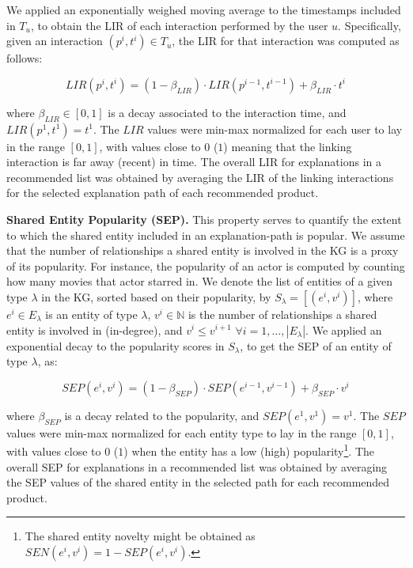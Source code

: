 \documentclass[sigconf]{acmart}
\begin{document}
We applied an exponentially weighed moving average to the timestamps included in $T_u$, to obtain the LIR of each interaction performed by the user $u$. 
Specifically, given an interaction $(p^i, t^i) \in T_u$, the LIR for that interaction was computed as follows: 

\vspace{-2mm}
\begin{equation} 
LIR(p^i, t^i) = ( 1 - \beta_{LIR} ) \cdot LIR(p^{i-1}, t^{i-1}) + \beta_{LIR} \cdot t^i    
\label{eq:lir}
\end{equation}

where $\beta_{LIR} \in [0, 1]$ is a decay associated to the interaction time, and $LIR(p^1, t^1) = t^1$. 
The $LIR$ values were min-max normalized for each user to lay in the range $[0, 1]$, with values close to $0$ ($1$) meaning that the linking interaction is far away (recent) in time. 
The overall LIR for explanations in a recommended list was obtained by averaging the LIR of the linking interactions for the selected explanation path of each recommended product.

\vspace{1mm}\noindent\textbf{Shared Entity Popularity (SEP).} 
This property serves to quantify the extent to which the shared entity included in an explanation-path is popular. 
We assume that the number of relationships a shared entity is involved in the KG is a proxy of its popularity. 
For instance, the popularity of an actor is computed by counting how many movies that actor starred in.
We denote the list of entities of a given type $\lambda$ in the KG, sorted based on their popularity, by $S_\lambda = [(e^i, v^i)]$, where $e^i \in E_\lambda$ is an entity of type $\lambda$, $v^i \in \mathbb N$ is the number of relationships a shared entity is involved in (in-degree), and $v^i \leq v^{i+1}$ $\forall i = 1, \dots, |E_\lambda|$. 
We applied an exponential decay to the popularity scores in $S_\lambda$, to get the SEP of an entity of type $\lambda$, as: 

\vspace{-2mm}
\begin{equation} 
SEP(e^i, v^i) = ( 1 - \beta_{SEP} ) \cdot SEP(e^{i-1}, v^{i-1}) + \beta_{SEP} \cdot v^i    
\label{eq:sep}
\end{equation}

where $\beta_{SEP}$ is a decay related to the popularity, and $SEP(e^1, v^1) = v^1$. 
The $SEP$ values were min-max normalized for each entity type to lay in the range $[0, 1]$, with values close to $0$ ($1$) when the entity has a low (high) popularity\footnote{The shared entity novelty might be obtained as $SEN(e^i, v^i) = 1-SEP(e^i, v^i)$.}. 
The overall SEP for explanations in a recommended list was obtained by averaging the SEP values of the shared entity in the selected path for each recommended product.
\end{document}
